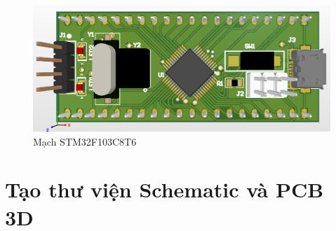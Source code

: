             \begin{figure}[H]
                \centering
                \includegraphics[width=1\textwidth]{pictures/pcb5.png}
                \caption{Mạch STM32F103C8T6}
                \label{fig:hbridge}
            \end{figure}
            \cleardoublepage
        \section{Tạo thư viện Schematic và PCB 3D}
